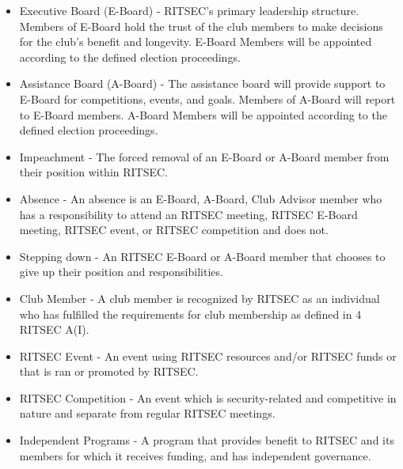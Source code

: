 \begin{itemize}
  \item Executive Board (E-Board) - RITSEC’s primary leadership structure.
    Members of E-Board hold the trust of the club members to make decisions for
    the club's benefit and longevity. E-Board Members will be appointed
    according to the defined election proceedings.
  \item Assistance Board (A-Board) - The assistance board will provide support
    to E-Board for competitions, events, and goals. Members of A-Board will
    report to E-Board members. A-Board Members will be appointed according to
    the defined election proceedings.
  \item Impeachment - The forced removal of an E-Board or A-Board member from
    their position within RITSEC.
  \item Absence - An absence is an E-Board, A-Board, Club Advisor member who
    has a responsibility to attend an RITSEC meeting, RITSEC E-Board meeting,
    RITSEC event, or RITSEC competition and does not.
  \item Stepping down - An RITSEC E-Board or A-Board member that chooses to
    give up their position and responsibilities.
  \item Club Member - A club member is recognized by RITSEC as an individual
    who has fulfilled the requirements for club membership as defined in
    4 RITSEC A(I).
  \item RITSEC Event - An event using RITSEC resources and/or RITSEC funds or
    that is ran or promoted by RITSEC.
  \item RITSEC Competition - An event which is security-related and competitive
    in nature and separate from regular RITSEC meetings.
  \item Independent Programs - A program that provides benefit to RITSEC and
    its members for which it receives funding, and has independent governance.
\end{itemize}